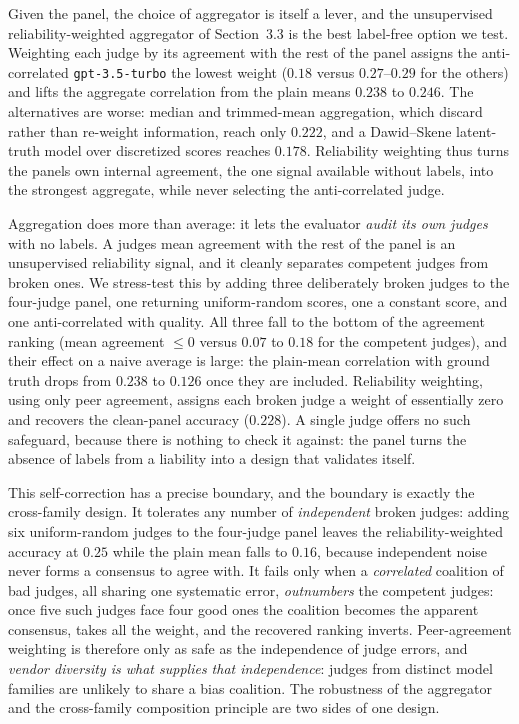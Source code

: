 \documentclass[11pt,a4paper]{article}
\begin{document}
Given the panel, the choice of aggregator is itself a lever, and the unsupervised reliability-weighted aggregator of
Section~3.3 is the best label-free option we test. Weighting each judge by its agreement with the rest of the
panel assigns the anti-correlated \texttt{gpt-3.5-turbo} the lowest weight (\(0.18\) versus \(0.27\)--\(0.29\) for
the others) and lifts the aggregate correlation from the plain mean\textquotesingle s \(0.238\) to \textbf{\(0.246\)}. The
alternatives are worse: median and trimmed-mean aggregation, which discard rather than re-weight information, reach
only \(0.222\), and a Dawid--Skene latent-truth model \citep{ref33} over discretized scores reaches
\(0.178\). Reliability weighting
thus turns the panel\textquotesingle s own internal agreement, the one signal available without labels, into the strongest aggregate,
while never selecting the anti-correlated judge.

Aggregation does more than average: it lets the evaluator \emph{audit its own judges} with no labels. A judge\textquotesingle s mean
agreement with the rest of the panel is an unsupervised reliability signal, and it cleanly separates competent judges
from broken ones. We stress-test this by adding three deliberately broken judges to the four-judge panel, one returning
uniform-random scores, one a constant score, and one anti-correlated with quality. All three fall to the bottom of the
agreement ranking (mean agreement \(\le 0\) versus \(0.07\) to \(0.18\) for the competent judges), and their effect on a naive
average is large: the plain-mean correlation with ground truth drops from \(0.238\) to \(0.126\) once they are included.
Reliability weighting, using only peer agreement, assigns each broken judge a weight of essentially zero and recovers
the clean-panel accuracy (\(0.228\)). A single judge offers no such safeguard, because there is nothing to check it
against: the panel turns the absence of labels from a liability into a design that validates itself.

This self-correction has a precise boundary, and the boundary is exactly the cross-family design. It tolerates any
number of \emph{independent} broken judges: adding six uniform-random judges to the four-judge panel leaves the
reliability-weighted accuracy at \(0.25\) while the plain mean falls to \(0.16\), because independent noise never forms a
consensus to agree with. It fails only when a \emph{correlated} coalition of bad judges, all sharing one
systematic error, \emph{outnumbers} the competent judges: once five such judges face four good ones the coalition
becomes the apparent consensus, takes all the weight, and the recovered ranking inverts. Peer-agreement weighting is
therefore only as safe as the independence of judge errors, and \emph{vendor diversity is what supplies that
independence}: judges from distinct model families are unlikely to share a bias coalition. The robustness of the
aggregator and the cross-family composition principle are two sides of one design.
\end{document}
